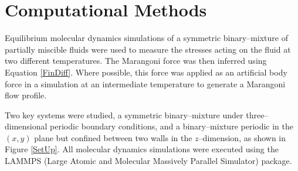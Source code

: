 \section{Computational Methods}

Equilibrium molecular dynamics simulations of a symmetric binary--mixture of partially miscible fluids were used to measure the stresses acting on the fluid at two different temperatures.
The Marangoni force was then inferred using Equation \ref{FinDiff}.
Where possible, this force was applied as an artificial body force in a simulation at an intermediate temperature to generate a Marangoni flow profile.

Two key systems were studied, a symmetric binary–mixture under three--dimensional periodic boundary conditions, and a binary--mixture periodic in the $(x,y)$ plane but confined between two walls in the $z$--dimension, as shown in Figure \ref{SetUp}.
All molecular dynamics simulations were executed using the LAMMPS (Large Atomic and Molecular Massively Parallel Simulator) package.\cite{LAMMPS}  


